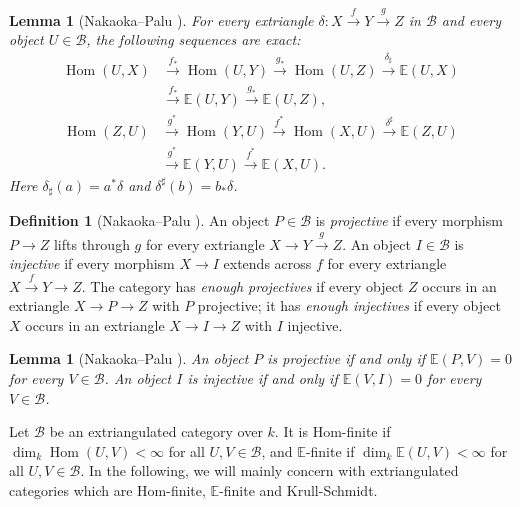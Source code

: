 \documentclass[pdflatex,sn-mathphys-num]{sn-jnl}
\numberwithin{equation}{section}
\newtheorem{lemma}[theorem]{Lemma}
\theoremstyle{definition}
\newtheorem{definition}[theorem]{Definition}
\theoremstyle{remark}\newtheorem{remark}[theorem]{Remark}
\newcommand{\E}{\mathbb E}
\newcommand{\Hom}{\operatorname{Hom}}
\newcommand{\dimk}{\dim_k}
\begin{document}
\begin{lemma}[{Nakaoka--Palu \cite[Corollary 3.12]{NP}}]\label{lem:HomE}
For every extriangle $\delta:X\xrightarrow fY\xrightarrow gZ$ in
$\mathcal B$ and every object $U\in\mathcal B$, the following sequences are exact:
\begin{equation}\label{eq:HomEcov}
\begin{aligned}
 \Hom(U,X)&\xrightarrow{f_*}\Hom(U,Y)
 \xrightarrow{g_*}\Hom(U,Z)\xrightarrow{\delta_\sharp}\E(U,X)\\
 &\xrightarrow{f_*}\E(U,Y)\xrightarrow{g_*}\E(U,Z),
\end{aligned}
\end{equation}
\begin{equation}\label{eq:HomEcontra}
\begin{aligned}
 \Hom(Z,U)&\xrightarrow{g^*}\Hom(Y,U)
 \xrightarrow{f^*}\Hom(X,U)\xrightarrow{\delta^\sharp}\E(Z,U)\\
 &\xrightarrow{g^*}\E(Y,U)\xrightarrow{f^*}\E(X,U).
\end{aligned}
\end{equation}
Here $\delta_\sharp(a)=a^*\delta$ and
$\delta^\sharp(b)=b_*\delta$.
\end{lemma}

\begin{definition}[{Nakaoka--Palu \cite[Definitions 3.23 and 3.25]{NP}}]
An object $P\in\mathcal B$ is \emph{projective} if every morphism $P\to Z$ lifts
through $g$ for every extriangle $X\to Y\xrightarrow gZ$.
An object $I\in\mathcal B$ is \emph{injective} if every morphism $X\to I$ extends
across $f$ for every extriangle $X\xrightarrow fY\to Z$.
The category has \emph{enough projectives} if every object $Z$
occurs in an extriangle $X\to P\to Z$ with $P$ projective; it has
\emph{enough injectives} if every object $X$ occurs in an extriangle
$X\to I\to Z$ with $I$ injective.
\end{definition}

\begin{lemma}[{Nakaoka--Palu \cite[Proposition 3.24]{NP}}]
\label{lem:proj-inj}
An object $P$ is projective if and only if $\E(P,V)=0$ for every
$V\in\mathcal B$. An object $I$ is injective if and only if
$\E(V,I)=0$ for every $V\in\mathcal B$.
\end{lemma}
Let $\mathcal B$ be an extriangulated category over $k$.
It is Hom-finite if $\dimk\Hom(U,V)<\infty$ for all $U,V\in\mathcal B$,
and $\E$-finite if $\dimk\E(U,V)<\infty$ for all $U,V\in\mathcal B$. In
the following, we will mainly concern with extriangulated categories which are Hom-finite, $\E$-finite and Krull-Schmidt.
\end{document}
